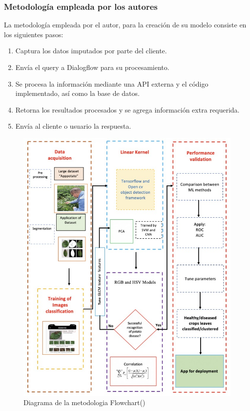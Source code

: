 \subsubsection{Metodología empleada por los autores}
La metodología empleada por el autor, para la creación de su modelo consiste en los siguientes pasos: 

\begin{enumerate}
    \item Captura los datos imputados por parte del cliente.
    \item Envía el query a Dialogflow para su procesamiento.
    \item Se procesa la información mediante una API externa y el código implementado, así como la base de datos.
    \item Retorna los resultados procesados y se agrega información extra requerida.
    \item Envía al cliente o usuario la respuesta.
\end{enumerate}

\begin{figure}[H]
	\begin{center}
		\includegraphics[width=1\textwidth]{2/figures/ant3.jpeg}
		\caption{Diagrama de la metodologia Flowchart(\cite{antecedente3})}
	\end{center}
\end{figure}

